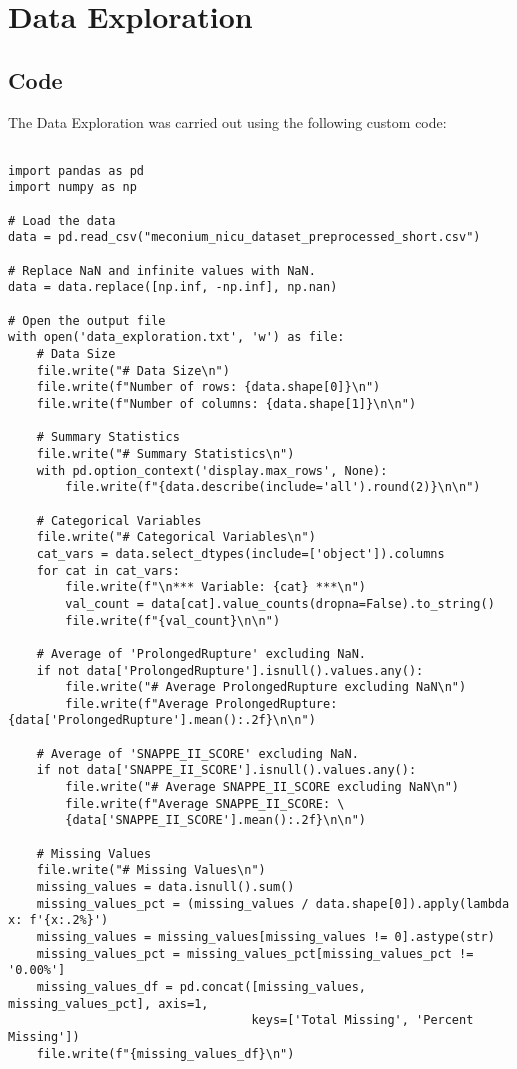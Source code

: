 \documentclass[11pt]{article}
\begin{document}
\section{Data Exploration} \subsection{Code}The Data Exploration was carried out using the following custom code:

\begin{verbatim}

import pandas as pd
import numpy as np

# Load the data
data = pd.read_csv("meconium_nicu_dataset_preprocessed_short.csv")

# Replace NaN and infinite values with NaN.
data = data.replace([np.inf, -np.inf], np.nan)

# Open the output file
with open('data_exploration.txt', 'w') as file:
    # Data Size
    file.write("# Data Size\n")
    file.write(f"Number of rows: {data.shape[0]}\n")
    file.write(f"Number of columns: {data.shape[1]}\n\n")

    # Summary Statistics
    file.write("# Summary Statistics\n")
    with pd.option_context('display.max_rows', None):
        file.write(f"{data.describe(include='all').round(2)}\n\n")

    # Categorical Variables
    file.write("# Categorical Variables\n")
    cat_vars = data.select_dtypes(include=['object']).columns
    for cat in cat_vars:
        file.write(f"\n*** Variable: {cat} ***\n")
        val_count = data[cat].value_counts(dropna=False).to_string()
        file.write(f"{val_count}\n\n")

    # Average of 'ProlongedRupture' excluding NaN.
    if not data['ProlongedRupture'].isnull().values.any():
        file.write("# Average ProlongedRupture excluding NaN\n")
        file.write(f"Average ProlongedRupture: {data['ProlongedRupture'].mean():.2f}\n\n")

    # Average of 'SNAPPE_II_SCORE' excluding NaN.
    if not data['SNAPPE_II_SCORE'].isnull().values.any():
        file.write("# Average SNAPPE_II_SCORE excluding NaN\n")
        file.write(f"Average SNAPPE_II_SCORE: \
        {data['SNAPPE_II_SCORE'].mean():.2f}\n\n")

    # Missing Values
    file.write("# Missing Values\n")
    missing_values = data.isnull().sum()
    missing_values_pct = (missing_values / data.shape[0]).apply(lambda x: f'{x:.2%}')
    missing_values = missing_values[missing_values != 0].astype(str)
    missing_values_pct = missing_values_pct[missing_values_pct != '0.00%']
    missing_values_df = pd.concat([missing_values, missing_values_pct], axis=1,
                                  keys=['Total Missing', 'Percent Missing'])
    file.write(f"{missing_values_df}\n")

\end{verbatim}
\end{document}
